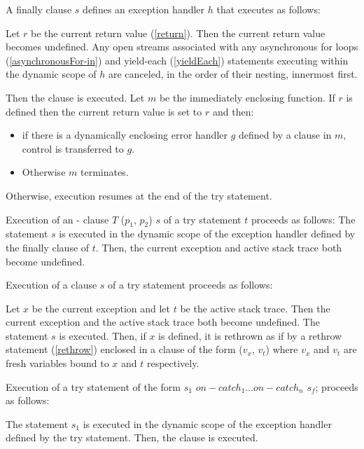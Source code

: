 \documentclass{article}
\newcommand{\code}[1]{{\sf #1}}
\begin{document}
\LMHash{}
A finally clause \FINALLY{} $s$ defines an exception handler $h$ that executes as follows:

\LMHash{}
Let $r$ be the current return value (\ref{return}). Then the current return value becomes undefined. Any open streams associated with any asynchronous for loops (\ref{asynchronousFor-in}) and yield-each (\ref{yieldEach}) statements executing within the dynamic scope of $h$ are canceled, in the order of their nesting, innermost first. 


\LMHash{}
Then the \FINALLY{} clause is executed. Let $m$ be the immediately enclosing function. If $r$ is defined then the current return value is set to $r$ and then:
\begin{itemize}
\item
 if there is a dynamically enclosing error handler $g$ defined by a \FINALLY{} clause in $m$, control is transferred to $g$.
 \item
Otherwise $m$ terminates. 
\end{itemize}

Otherwise, execution resumes at the end of the try statement.

\LMHash{}
Execution of an \ON{}-\CATCH{} clause \code{\ON{} $T$ \CATCH{} ($p_1$, $p_2$)} $s$ of a try statement $t$ proceeds as follows: The statement $s$ is executed in the dynamic scope of the exception handler defined by the finally clause of $t$. Then, the current exception and active stack trace both become undefined.

\LMHash{}
Execution of a \FINALLY{} clause \FINALLY{} $s$ of a try statement proceeds as follows: 

\LMHash{}
Let $x$ be the current exception and let $t$ be the active stack trace. Then the current exception and the active stack trace both become undefined. The statement $s$ is executed. Then, if $x$ is defined,  it is rethrown as if by a rethrow statement (\ref{rethrow}) enclosed in a \CATCH{} clause of the form \code{\CATCH{} ($v_x$, $v_t$)} where $v_x$ and $v_t$ are fresh variables bound to $x$ and $t$ respectively.


\LMHash{}
Execution of a try statement of the form \code{\TRY{} $s_1$ $on-catch_1 \ldots on-catch_n$ \FINALLY{} $s_f$;}  proceeds as follows:

\LMHash{}
The statement $s_1$ is executed in the dynamic scope of the exception handler defined by the try statement. Then, the \FINALLY{} clause is executed.
\end{document}
